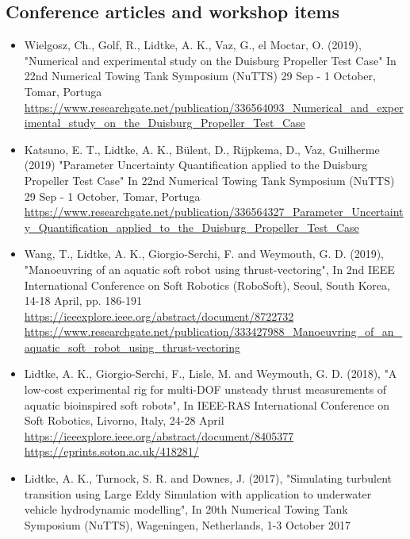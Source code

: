 \documentclass[a4paper,10pt]{article}
\begin{document}
\subsection{Conference articles and workshop items}
%
\begin{itemize}
%
\item Wielgosz, Ch., Golf, R., Lidtke, A. K., Vaz, G., el Moctar, O. (2019),
	"Numerical and experimental study on the Duisburg Propeller Test Case"
	In 22nd Numerical Towing Tank Symposium (NuTTS)
	29 Sep - 1 October, Tomar, Portuga
	\cite{Wielgosz2019}
	\\ \url{https://www.researchgate.net/publication/336564093_Numerical_and_experimental_study_on_the_Duisburg_Propeller_Test_Case}
%
\item Katsuno, E. T., Lidtke, A. K., B{\"u}lent, D., Rijpkema, D., Vaz, Guilherme (2019)
	"Parameter Uncertainty Quantification applied to the Duisburg Propeller Test Case"
	In 22nd Numerical Towing Tank Symposium (NuTTS)
	29 Sep - 1 October, Tomar, Portuga
	\cite{Katsuno2019}
	\\ \url{https://www.researchgate.net/publication/336564327_Parameter_Uncertainty_Quantification_applied_to_the_Duisburg_Propeller_Test_Case}
%
\item Wang, T., Lidtke, A. K., Giorgio-Serchi, F. and Weymouth, G. D. (2019),
	"Manoeuvring of an aquatic soft robot using thrust-vectoring",
	In 2nd IEEE International Conference on Soft Robotics (RoboSoft),
	Seoul, South Korea, 14-18 April, pp. 186-191
	\cite{Wang2019}
	\\ \url{https://ieeexplore.ieee.org/abstract/document/8722732}
	\\ \url{https://www.researchgate.net/publication/333427988\_Manoeuvring\_of\_an\_aquatic\_soft\_robot\_using\_thrust-vectoring}
%
\item Lidtke, A. K., Giorgio-Serchi, F., Lisle, M. and Weymouth, G. D. (2018),
	"A low-cost experimental rig for multi-DOF unsteady thrust measurements of aquatic bioinspired soft robots",
	In IEEE-RAS International Conference on Soft Robotics, Livorno, Italy, 24-28 April
	\cite{Lidtke2018a}
	\\ \url{https://ieeexplore.ieee.org/abstract/document/8405377}
	\\ \url{https://eprints.soton.ac.uk/418281/}
%
\item Lidtke, A. K., Turnock, S. R. and Downes, J. (2017),
	"Simulating turbulent transition using Large Eddy Simulation with application to underwater vehicle hydrodynamic modelling",
	In 20th Numerical Towing Tank Symposium (NuTTS), Wageningen, Netherlands, 1-3 October 2017

\end{itemize}
\end{document}
